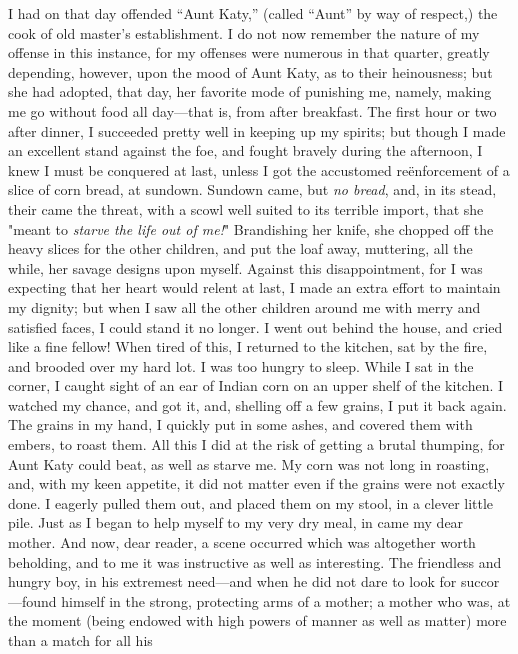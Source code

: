 I had on that day offended ``Aunt Katy,'' (called ``Aunt'' by way of
respect,) the cook of old master's establishment. I do not now remember
the nature of my offense in this instance, for my offenses were
{\protect\hypertarget{55}{}{}}numerous in that quarter, greatly
depending, however, upon the mood of Aunt Katy, as to their heinousness;
but she had adopted, that day, her favorite mode of punishing me,
namely, making me go without food all day---that is, from after
breakfast. The first hour or two after dinner, I succeeded pretty well
in keeping up my spirits; but though I made an excellent stand against
the foe, and fought bravely during the afternoon, I knew I must be
conquered at last, unless I got the accustomed reënforcement of a slice
of corn bread, at sundown. Sundown came, but \emph{no bread}, and, in
its stead, their came the threat, with a scowl well suited to its
terrible import, that she "meant to \emph{starve the life out of me!}"
Brandishing her knife, she chopped off the heavy slices for the other
children, and put the loaf away, muttering, all the while, her savage
designs upon myself. Against this disappointment, for I was expecting
that her heart would relent at last, I made an extra effort to maintain
my dignity; but when I saw all the other children around me with merry
and satisfied faces, I could stand it no longer. I went out behind the
house, and cried like a fine fellow! When tired of this, I returned to
the kitchen, sat by the fire, and brooded over my hard lot. I was too
hungry to sleep. While I sat in the corner, I caught sight of an ear of
Indian corn on an upper shelf of the kitchen. I watched my chance, and
got it, and, shelling off a few grains, I put it back again. The grains
in my hand, I quickly put in some ashes, and covered them with embers,
to roast them. All this I did at the risk of getting a brutal thumping,
for Aunt Katy could beat, as well as starve me. My corn was not long in
{\protect\hypertarget{56}{}{}}roasting, and, with my keen appetite, it
did not matter even if the grains were not exactly done. I eagerly
pulled them out, and placed them on my stool, in a clever little pile.
Just as I began to help myself to my very dry meal, in came my dear
mother. And now, dear reader, a scene occurred which was altogether
worth beholding, and to me it was instructive as well as interesting.
The friendless and hungry boy, in his extremest need---and when he did
not dare to look for succor---found himself in the strong, protecting
arms of a mother; a mother who was, at the moment (being endowed with
high powers of manner as well as matter) more than a match for all his
